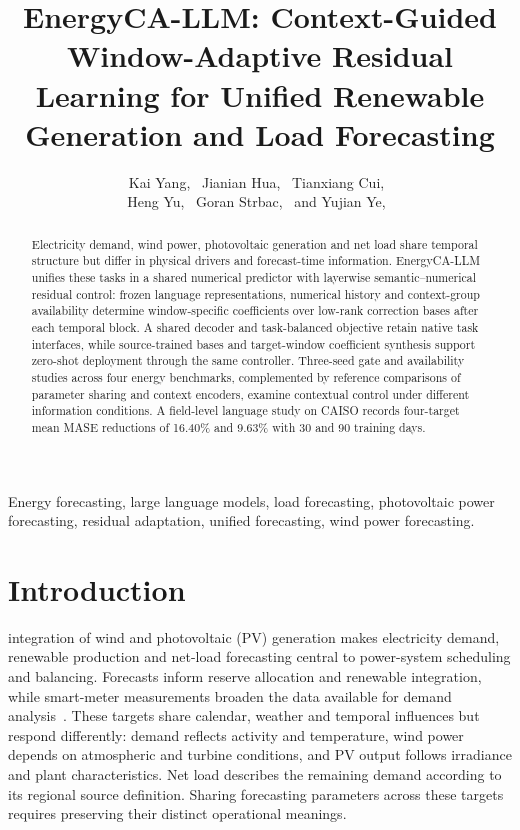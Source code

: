 \documentclass[journal]{IEEEtran}
\title{EnergyCA-LLM: Context-Guided Window-Adaptive Residual Learning for Unified Renewable Generation and Load Forecasting}
\author{Kai Yang,~\IEEEmembership{Student Member,~IEEE,}
        Jianian Hua,~\IEEEmembership{Student Member,~IEEE,}
        Tianxiang Cui,~\IEEEmembership{Senior Member,~IEEE,} \\
        Heng Yu,~\IEEEmembership{Senior Member,~IEEE,}
        Goran Strbac,~\IEEEmembership{Fellow,~IEEE,}
        and Yujian Ye,~\IEEEmembership{Senior Member,~IEEE}
}
\begin{document}
\raggedbottom
{}
\maketitle

\begin{abstract}
Electricity demand, wind power, photovoltaic generation and net load share temporal structure but differ in physical drivers and forecast-time information. EnergyCA-LLM unifies these tasks in a shared numerical predictor with layerwise semantic--numerical residual control: frozen language representations, numerical history and context-group availability determine window-specific coefficients over low-rank correction bases after each temporal block. A shared decoder and task-balanced objective retain native task interfaces, while source-trained bases and target-window coefficient synthesis support zero-shot deployment through the same controller. Three-seed gate and availability studies across four energy benchmarks, complemented by reference comparisons of parameter sharing and context encoders, examine contextual control under different information conditions. A field-level language study on CAISO records four-target mean MASE reductions of 16.40\% and 9.63\% with 30 and 90 training days.
\end{abstract}

\begin{IEEEkeywords}
Energy forecasting, large language models, load forecasting, photovoltaic power forecasting, residual adaptation, unified forecasting, wind power forecasting.
\end{IEEEkeywords}

\section{Introduction}
\label{sec:introduction}

 integration of wind and photovoltaic (PV) generation makes electricity demand, renewable production and net-load forecasting central to power-system scheduling and balancing. Forecasts inform reserve allocation and renewable integration, while smart-meter measurements broaden the data available for demand analysis~\cite{wang2019smartmeterreview,browell2021regionalNetLoad,devilmarest2024adaptive}. These targets share calendar, weather and temporal influences but respond differently: demand reflects activity and temperature, wind power depends on atmospheric and turbine conditions, and PV output follows irradiance and plant characteristics. Net load describes the remaining demand according to its regional source definition. Sharing forecasting parameters across these targets requires preserving their distinct operational meanings.
\end{document}
